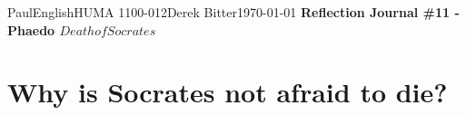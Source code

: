 \documentclass[12pt,letterpaper]{article}
\begin{document}
\begin{mla}{Paul}{English}{HUMA 1100-012}{Derek
    Bitter}{\today}    
    {\textbf{Reflection Journal \#11 - Phaedo \(Death of Socrates\)}}

\section*{Why is Socrates not afraid to die?}




\end{mla}
\end{document}
